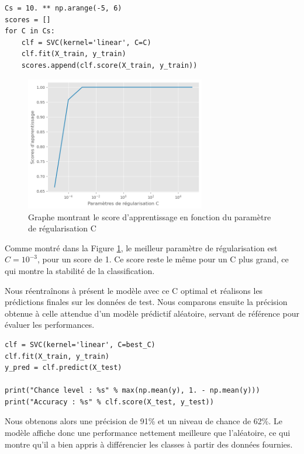 \documentclass{scrartcl}
\begin{document}
\begin{lstlisting}
Cs = 10. ** np.arange(-5, 6)
scores = []
for C in Cs:
    clf = SVC(kernel='linear', C=C)
    clf.fit(X_train, y_train)
    scores.append(clf.score(X_train, y_train)) 
\end{lstlisting}

\begin{figure}[H]
    \centering
    \includegraphics[width=0.7\textwidth]{../images/classification.png}
    \caption{\centering Graphe montrant le score d'apprentissage en fonction du paramètre de régularisation C} 
    \label{fig:score}
\end{figure}

Comme montré dans la Figure \ref{fig:score}, le meilleur paramètre de régularisation est $C = 10^{-3}$, pour un score de 1. Ce score reste le même pour un C plus grand, ce qui montre la stabilité de la classification.\newline

Nous réentraînons à présent le modèle avec ce C optimal et réalisons les prédictions finales sur les données de test. Nous comparons ensuite la précision obtenue à celle attendue d'un modèle prédictif aléatoire, servant de référence pour évaluer les performances.
\begin{lstlisting}
clf = SVC(kernel='linear', C=best_C)
clf.fit(X_train, y_train)
y_pred = clf.predict(X_test)

print("Chance level : %s" % max(np.mean(y), 1. - np.mean(y)))
print("Accuracy : %s" % clf.score(X_test, y_test))
\end{lstlisting}

Nous obtenons alors une précision de 91\% et un niveau de chance de 62\%. Le modèle affiche donc une performance nettement meilleure que l'aléatoire, ce qui montre qu'il a bien appris à différencier les classes à partir des données fournies.\newline
\end{document}
